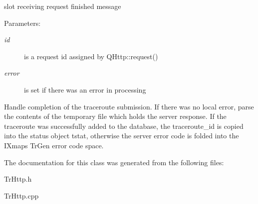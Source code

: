 slot receiving request finished message \begin{Desc}
\item[Parameters:]
\begin{description}
\item[{\em id}]is a request id assigned by QHttp::request() \item[{\em error}]is set if there was an error in processing\end{description}
\end{Desc}
Handle completion of the traceroute submission. If there was no local error, parse the contents of the temporary file which holds the server response. If the traceroute was successfully added to the database, the traceroute\_\-id is copied into the status object tstat, otherwise the server error code is folded into the IXmaps TrGen error code space. 

The documentation for this class was generated from the following files:\begin{CompactItemize}
\item 
TrHttp.h\item 
TrHttp.cpp\end{CompactItemize}
